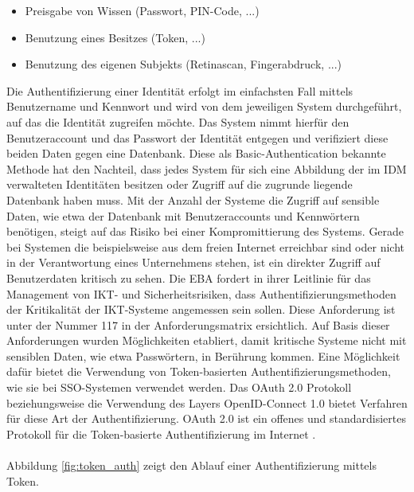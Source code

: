 \begin{itemize}
    \item Preisgabe von Wissen (Passwort, PIN-Code, ...)
    \item Benutzung eines Besitzes (Token, ...)
    \item Benutzung des eigenen Subjekts (Retinascan, Fingerabdruck, ...)
\end{itemize}
\bigbreak
Die Authentifizierung einer Identität erfolgt im einfachsten Fall mittels Benutzername und Kennwort und wird von dem jeweiligen System durchgeführt, auf das die Identität zugreifen möchte. Das System nimmt hierfür den Benutzeraccount und das Passwort der Identität entgegen und verifiziert diese beiden Daten gegen eine Datenbank. Diese als \glqq{}Basic-Authentication\grqq{} bekannte Methode hat den Nachteil, dass jedes System für sich eine Abbildung der im IDM verwalteten Identitäten besitzen oder Zugriff auf die zugrunde liegende Datenbank haben muss. Mit der Anzahl der Systeme die Zugriff auf sensible Daten, wie etwa der Datenbank mit Benutzeraccounts und Kennwörtern benötigen, steigt auf das Risiko bei einer Kompromittierung des Systems. Gerade bei Systemen die beispielsweise aus dem freien Internet erreichbar sind oder nicht in der Verantwortung eines Unternehmens stehen, ist ein direkter Zugriff auf Benutzerdaten kritisch zu sehen. \autocite{rolls_haber_2020}
\bigbreak
Die EBA fordert in ihrer Leitlinie für das Management von IKT- und Sicherheitsrisiken, dass Authentifizierungsmethoden der Kritikalität der IKT-Systeme angemessen sein sollen. Diese Anforderung ist unter der Nummer 117 in der Anforderungsmatrix ersichtlich. Auf Basis dieser Anforderungen wurden Möglichkeiten etabliert, damit kritische Systeme nicht mit sensiblen Daten, wie etwa Passwörtern, in Berührung kommen. Eine Möglichkeit dafür bietet die Verwendung von Token-basierten Authentifizierungsmethoden, wie sie bei SSO-Systemen verwendet werden. Das \glqq{}OAuth 2.0 Protokoll\grqq{} beziehungsweise die Verwendung des Layers \glqq{}OpenID-Connect 1.0\grqq{} bietet Verfahren für diese Art der Authentifizierung. OAuth 2.0 ist ein offenes und standardisiertes Protokoll für die Token-basierte Authentifizierung im Internet \autocite{OAUTH2} \autocite{OpenID}. \\\\
Abbildung \ref{fig:token_auth} zeigt den Ablauf einer Authentifizierung mittels Token.  
